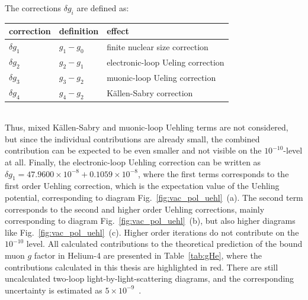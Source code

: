 The corrections $\delta g_i$ are defined as:\\[10pt]
\begin{tabular}{lll}
correction & definition & effect\\\hline
$\delta g_1$ & $g_1-g_0$ & finite nuclear size correction\\
$\delta g_2$ & $g_2-g_1$ & electronic-loop Ueling correction\\
$\delta g_3$ & $g_3-g_2$ & muonic-loop Ueling correction\\
$\delta g_4$ & $g_4-g_2$ & Källen-Sabry correction\\
\end{tabular}\\[30pt]
Thus, mixed Källen-Sabry and muonic-loop Uehling terms are not considered, but since the individual contributions are already small, the combined contribution can be expected to be even smaller and not visible on the $10^{-10}$-level at all. Finally, the electronic-loop Uehling correction can be written as $\delta g_1=47.9600\times 10^{-8}+0.1059\times 10^{-8}$, where the first terms corresponds to the first order Uehling correction, which is the expectation value of the Uehling potential, corresponding to diagram Fig.~\ref{fig:vac_pol_uehl}~(a). The second term corresponds to the second and higher order Uehling corrections, mainly corresponding to diagram Fig.~\ref{fig:vac_pol_uehl}~(b), but also higher diagrams like Fig.~\ref{fig:vac_pol_uehl}~(c). Higher order iterations do not contribute on the $10^{-10}$ level. All calculated contributions to the theoretical prediction of the bound muon $g$ factor in Helium-4 are presented in Table~\ref{tab:gHe}, where the contributions calculated in this thesis are highlighted in red. There are still uncalculated two-loop light-by-light-scattering diagrams, and the corresponding uncertainty is estimated as $5\times 10^{-9}$~\cite{sikora2018}.

